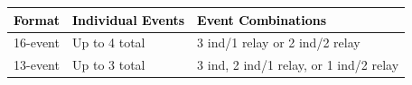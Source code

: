 \begin{table}[H]
\centering
\renewcommand{\arraystretch}{1.4}
\begin{tabular}{p{3.5cm} p{4.5cm} p{6cm}}
\toprule
\rowcolor{teamprimary!25}
\textbf{\textcolor{black}{Format}} & \textbf{\textcolor{black}{Individual Events}} & \textbf{\textcolor{black}{Event Combinations}} \\
\midrule
\rowcolor{teamsecondary!15}
16-event & Up to 4 total & 3 ind/1 relay or 2 ind/2 relay \\
\rowcolor{teamprimary!10}
13-event & Up to 3 total & 3 ind, 2 ind/1 relay, or 1 ind/2 relay \\
\bottomrule
\end{tabular}
\end{table}